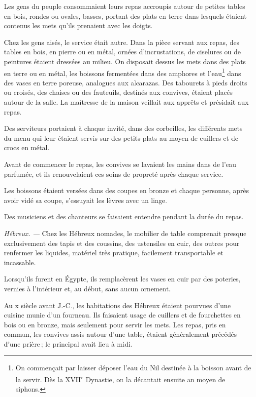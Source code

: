 Les gens du peuple consommaient leurs repas accroupis autour de petites tables
en bois, rondes ou ovales, basses, portant des plats en terre dans lesquels
étaient contenus les mets qu'ils prenaient avec les doigts.

Chez les gens aisés, le service était autre. Dans la pièce servant aux repas,
des tables en bois, en pierre ou en métal, ornées d'incrustations, de ciselures
ou de peintures étaient dressées au milieu. On disposait dessus les mets dans
des plats en terre ou en métal, les boissons fermentées dans des amphores et
l'eau\footnote{On commençait par laisser déposer l'eau du Nil destinée à la
boisson avant de la servir. Dès la \textsc{XVII}\textsuperscript{e} Dynastie,
on la décantait ensuite an moyen de siphons.} dans des vases en terre poreuse,
analogues aux alcarazas. Des tabourets à pieds droits ou croisés, des chaises
ou des fauteuils, destinés aux convives, étaient placés autour de la salle. La
maîtresse de la maison veillait aux apprêts et présidait aux repas.

Des serviteurs portaient à chaque invité, dans des corbeilles, les différents
mets du menu qui leur étaient servis sur des petits plats au moyen de cuillers
et de crocs en métal.

Avant de commencer le repas, les convives se lavaient les mains dans de l'eau
parfumée, et ils renouvelaient ces soins de propreté après chaque service.

Les boissons étaient versées dans des coupes en bronze et chaque personne,
après avoir vidé sa coupe, s'essuyait les lèvres avec un linge.

Des musiciens et des chanteurs se faisaient entendre pendant la durée du repas.

\sk

\textit{Hébreux. —} Chez les Hébreux nomades, le mobilier de table comprenait
presque exclusivement des tapis et des coussins, des ustensiles en cuir, des
outres pour renfermer les liquides, matériel très pratique, facilement
transportable et incassable.

Lorsqu'ils furent en Égypte, ils remplacèrent les vases en cuir par des
poteries, vernies à l'intérieur et, au début, sans aucun ornement.

Au x siècle avant J.-C., les habitations des Hébreux étaient pourvues d'une
cuisine munie d'un fourneau. Ils faisaient usage de cuillers et de fourchettes
en bois ou en bronze, mais seulement pour servir les mets. Les repas, pris en
commun, les convives assis autour d'une table, étaient généralement précédés
d'une prière ; le principal avait lieu à midi.

